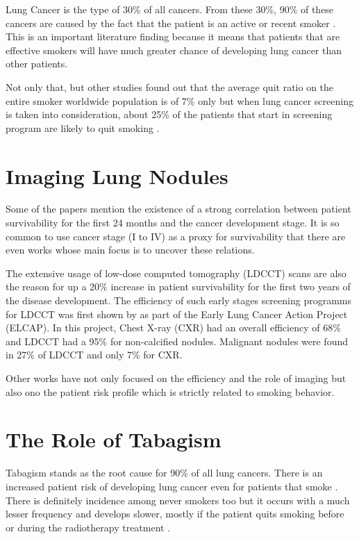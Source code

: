 Lung Cancer is the type of 30\% of all cancers. From these 30\%, 90\% of these cancers are  caused by the fact that the patient is an active or recent smoker \cite{jaklitsch2012, nccn2019, roberts2013}. This is an important literature finding because it means that patients that are effective smokers will have much greater chance of developing lung cancer than other patients.

Not only that, but other studies found out that the average quit ratio on the entire smoker worldwide population is of 7\% only but when lung  cancer screening is taken into consideration, about 25\% of the patients that start in screening program are likely to quit smoking \cite{fox2003, aalst2010}. %

\section{Imaging Lung Nodules}

Some of the papers mention the existence of a strong correlation between patient survivability for the first 24 months and the cancer development stage. It is so common to use cancer stage (I to IV) as a proxy for survivability that there are even works whose main focus is to uncover these relations\cite{roberts2013, fox2003}.

The extensive usage of low-dose computed tomography (LDCCT) scans are also the reason for up a 20\% increase in patient survivability for the first two years of the disease development\cite{fox2003, macredmond2006, mountain2008, jaklitsch2012}. The efficiency of such early stages screening programms for LDCCT was first shown by  as part of the Early Lung Cancer Action  Project (ELCAP). In this project, Chest X-ray (CXR) had an overall efficiency of 68\% and LDCCT had a 95\% for non-calcified nodules. Malignant nodules were found in 27\% of LDCCT and only 7\% for CXR. 

Other works have not only focused on the efficiency and the role of imaging but also ono the patient risk profile which is strictly related to smoking behavior.

\section{The Role of Tabagism}

Tabagism stands as the root cause for 90\% of all lung cancers. There is an increased patient risk of developing lung cancer even for patients that smoke \cite{ostroff2001, aalst2010, aalst2011}. There is definitely incidence among never smokers too but it occurs with a much lesser frequency and develops slower, mostly if the patient quits smoking before or during the radiotherapy treatment \cite{fox2003, rivera2016}.

